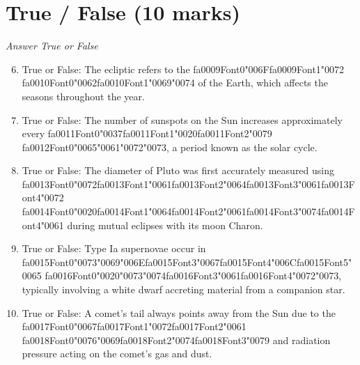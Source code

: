 \documentclass[12pt]{article}
\begin{document}
\section*{True / False (10 marks)}
\textit{Answer True or False}
\begin{enumerate}[label=\arabic*.]
\setcounter{enumi}{5}
\item True or False: The ecliptic refers to the {\csname fa0009Font0\endcsname\char"006F}{\csname fa0009Font1\endcsname\char"0072} {\csname fa0010Font0\endcsname\char"0062}{\csname fa0010Font1\endcsname\char"0069}{\char"0074} of the Earth, which affects the seasons throughout the year.
\item True or False: The number of sunspots on the Sun increases approximately every {\csname fa0011Font0\endcsname\char"0037}{\csname fa0011Font1\endcsname\char"0020}{\csname fa0011Font2\endcsname\char"0079} {\csname fa0012Font0\endcsname\char"0065}{\char"0061}{\char"0072}{\char"0073}, a period known as the solar cycle.
\item True or False: The diameter of Pluto was first accurately measured using {\csname fa0013Font0\endcsname\char"0072}{\csname fa0013Font1\endcsname\char"0061}{\csname fa0013Font2\endcsname\char"0064}{\csname fa0013Font3\endcsname\char"0061}{\csname fa0013Font4\endcsname\char"0072} {\csname fa0014Font0\endcsname\char"0020}{\csname fa0014Font1\endcsname\char"0064}{\csname fa0014Font2\endcsname\char"0061}{\csname fa0014Font3\endcsname\char"0074}{\csname fa0014Font4\endcsname\char"0061} during mutual eclipses with its moon Charon.
\item True or False: Type Ia supernovae occur in {\csname fa0015Font0\endcsname\char"0073}{\char"0069}{\char"006E}{\csname fa0015Font3\endcsname\char"0067}{\csname fa0015Font4\endcsname\char"006C}{\csname fa0015Font5\endcsname\char"0065} {\csname fa0016Font0\endcsname\char"0020}{\char"0073}{\char"0074}{\csname fa0016Font3\endcsname\char"0061}{\csname fa0016Font4\endcsname\char"0072}{\char"0073}, typically involving a white dwarf accreting material from a companion star.
\item True or False: A comet's tail always points away from the Sun due to the {\csname fa0017Font0\endcsname\char"0067}{\csname fa0017Font1\endcsname\char"0072}{\csname fa0017Font2\endcsname\char"0061} {\csname fa0018Font0\endcsname\char"0076}{\char"0069}{\csname fa0018Font2\endcsname\char"0074}{\csname fa0018Font3\endcsname\char"0079} and radiation pressure acting on the comet's gas and dust.
\end{enumerate}
\end{document}
